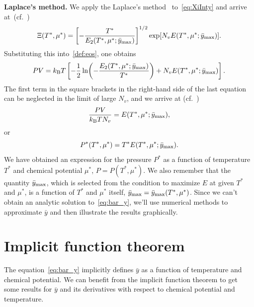 \documentclass[12pt]{article}
\numberwithin{equation}{section}
\begin{document}
	\textbf{Laplace's method.} We apply the Laplace's method~\cite[(1.21)]{Fedoryuk89} to~\eqref{eq:XiInty} and arrive at~(cf.~\cite[(19)]{KD22})
	\begin{equation}
		\Xi(T^*,\mu^*) = \left[-\frac{T^*}{E_2(T^*,\mu^*;\bar{y}_{\rm max})}\right]^{1/2} \exp[N_v E(T^*,\mu^*;\bar{y}_{\rm max})].
	\end{equation}
	Substituting this into~\eqref{def:eos}, one obtains
	\begin{equation}
		P V = k_{\rm B}T \left[-\frac{1}{2} \ln(-\frac{E_2(T^*,\mu^*;\bar{y}_{\rm max})}{T^*}) + N_v E(T^*,\mu^*;\bar{y}_{\rm max})\right].
	\end{equation}
	The first term in the square brackets in the right-hand side of the last equation can be neglected in the limit of large $N_v$, and we arrive at (cf.~\cite[(2.27)]{KKD20})
	\begin{equation}
		\frac{P V}{k_{\rm B}T N_v} = E(T^*,\mu^*;\bar{y}_{\rm max}),
	\end{equation}
	or
	\begin{equation}
		\label{eos:reduced}
		P^*(T^*,\mu^*) = T^* E(T^*,\mu^*;\bar{y}_{\rm max}).
	\end{equation}
	We have obtained an expression for the pressure $P^*$ as a function of temperature $T^*$ and chemical potential $\mu^*$, $P = P(T^*, \mu^*)$. We also remember that the quantity $\bar{y}_{\rm max}$, which is selected from the condition to maximize $E$ at given $T^*$ and $\mu^*$, is a function of $T^*$ and $\mu^*$ itself, $\bar{y}_{\rm max} = \bar{y}_{\rm max}(T^*,\mu^*)$. Since we can't obtain an analytic solution to~\eqref{eq:bar_y}, we'll use numerical methods to approximate $\bar{y}$ and then illustrate the results graphically.

	
	\pagebreak
	\section{Implicit function theorem}
	The equation~\eqref{eq:bar_y} implicitly defines $\bar{y}$ as a function of temperature and chemical potential. We can benefit from the implicit function theorem to get some results for $\bar{y}$ and its derivatives with respect to chemical potential and temperature.
	
\end{document}
